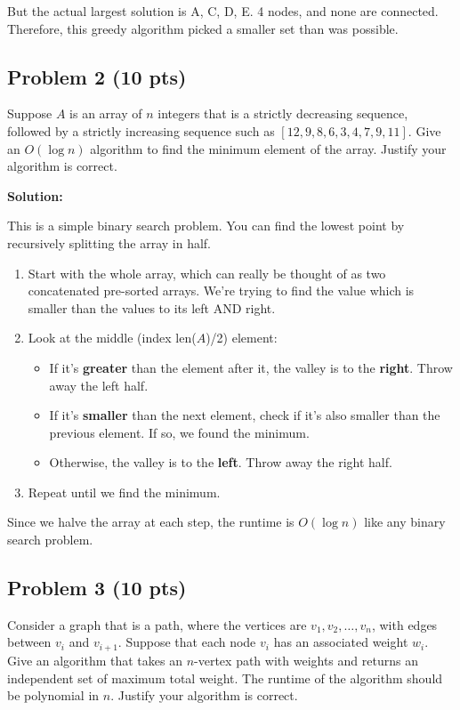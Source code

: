 \documentclass[12pt]{article}
\begin{document}
But the actual largest solution is {A, C, D, E}. 4 nodes, and none are connected.
Therefore, this greedy algorithm picked a smaller set than was possible.

\subsection*{Problem 2 (10 pts)}
Suppose $A$ is an array of $n$ integers that is a strictly decreasing sequence, followed by a strictly increasing sequence such as $[12, 9, 8, 6, 3, 4, 7, 9, 11]$. Give an $O(\log n)$ algorithm to find the minimum element of the array. Justify your algorithm is correct.

\textbf{Solution:}

This is a simple binary search problem. You can find the lowest point by recursively splitting the array in half.

\begin{enumerate}
    \item Start with the whole array, which can really be thought of as two concatenated pre-sorted arrays. We're trying to find the value which is smaller than the values to its left AND right.
    \item Look at the middle (index len($A$)/2) element:
    \begin{itemize}
        \item If it's \textbf{greater} than the element after it, the valley is to the \textbf{right}. Throw away the left half.
        \item If it's \textbf{smaller} than the next element, check if it's also smaller than the previous element. If so, we found the minimum.
        \item Otherwise, the valley is to the \textbf{left}. Throw away the right half.
    \end{itemize}
    \item Repeat until we find the minimum.
\end{enumerate}

Since we halve the array at each step, the runtime is $O(\log n)$ like any binary search problem.

\subsection*{Problem 3 (10 pts)}
Consider a graph that is a path, where the vertices are $v_1, v_2, \ldots, v_n$, with edges between $v_i$ and $v_{i+1}$. Suppose that each node $v_i$ has an associated weight $w_i$. Give an algorithm that takes an $n$-vertex path with weights and returns an independent set of maximum total weight. The runtime of the algorithm should be polynomial in $n$. Justify your algorithm is correct.
\end{document}
